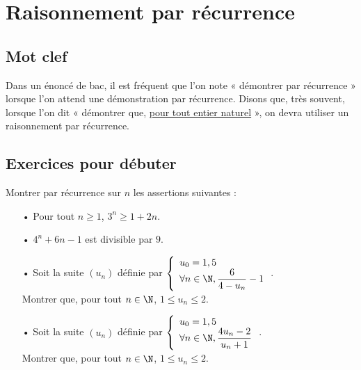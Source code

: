 \chapter{Raisonnement par récurrence}

\vspace*{-1cm}

\section{Mot clef}

Dans un énoncé de bac, il est fréquent que l'on note « démontrer par récurrence » lorsque l'on attend une démonstration par récurrence. Disons que, très souvent, lorsque l'on dit « démontrer que, \underline{pour tout entier naturel} », on devra utiliser un raisonnement par récurrence.

\vspace*{-.3cm}

\section{Exercices pour débuter}

Montrer par récurrence sur $n$ les assertions suivantes : \\

\begin{itemize}
\item[•] Pour tout $n \geqslant 1$, $3^n \geqslant 1 + 2n$. \\

\item[•] $4^n + 6n - 1$ est divisible par $9$. \\

\item[•] Soit la suite $\left(u_n\right)$ définie par $\left\{
  \begin{array}{l}
    u_0 = 1,5 \\
    \forall n \in \N, \dfrac{6}{4 - u_n} - 1 \\
  \end{array}
\right.$. \\

Montrer que, pour tout $n \in \N$, $1 \leqslant u_n \leqslant 2$. \\

\item[•] Soit la suite $\left(u_n\right)$ définie par $\left\{
  \begin{array}{l}
    u_0 = 1,5 \\
    \forall n \in \N, \dfrac{4u_n - 2}{u_n + 1 }\\
  \end{array}
\right.$. \\

Montrer que, pour tout $n \in \N$, $1 \leqslant u_n \leqslant 2$. 
\end{itemize}

